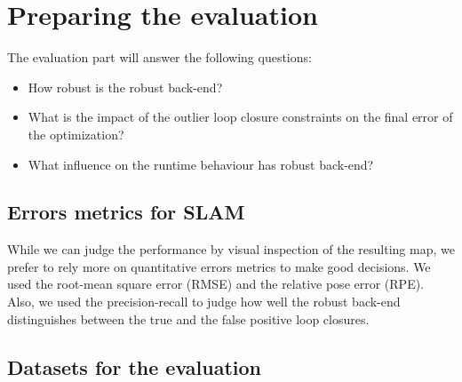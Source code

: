 \documentclass[9pt,technote]{IEEEtran}
\begin{document}
\section{Preparing the evaluation}
The evaluation part will answer the following questions:
\begin{itemize}
\item How robust is the robust back-end?
\item What is the impact of the outlier loop closure constraints on the final error of the optimization?
\item What influence on the runtime behaviour has robust back-end?
\end{itemize}
\subsection{Errors metrics for SLAM}
While we can judge the performance by visual inspection of the resulting map, we prefer to rely more on quantitative errors metrics to make good decisions.
We used the root-mean square error (RMSE) and the relative pose error (RPE). Also, we used the precision-recall to judge how well the robust back-end distinguishes between the true and the false positive loop closures.
\subsection{Datasets for the evaluation}
\begin{table}[!hbt]
		\centering
		\caption{The dataset used during the evaluation}
		\label{tab:simParameters}
\end{table}
\end{document}
